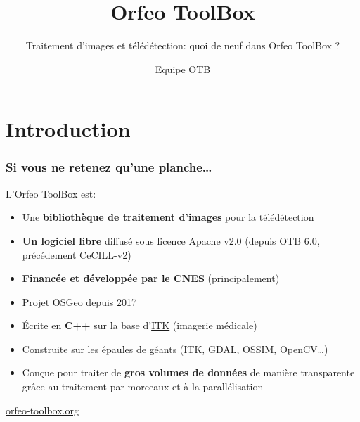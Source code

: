 \documentclass[8pt]{beamer}
\title{Orfeo ToolBox}
\subtitle{Traitement d'images et télédétection: quoi de neuf dans Orfeo ToolBox ?}
\author{Equipe OTB}%
\date{}
\begin{document}
\begin{frame}
\titlepage
\end{frame}

\section*{Introduction}

\begin{frame}
\frametitle{Si vous ne retenez qu'une planche\ldots}
\begin{block}{L'Orfeo ToolBox est:}
\begin{itemize}
\item Une \textbf{bibliothèque de traitement d'images} pour la télédétection
\item \textbf{Un logiciel libre} diffusé sous licence Apache v2.0 (depuis OTB 6.0, précédement CeCILL-v2)
\item \textbf{Financée et développée par le CNES} (principalement)
\item Projet OSGeo depuis 2017
\item Écrite en \textbf{C++} sur la base d'\href{www.itk.org}{ITK} (imagerie médicale)
\item Construite sur les épaules de géants (ITK, GDAL, OSSIM, OpenCV\ldots)
\item Conçue pour traiter de \textbf{gros volumes de données} de manière transparente grâce au traitement par morceaux et à la parallélisation
\end{itemize}
\end{block}

\begin{center}
{\huge\textcolor{red}{\href{http://www.orfeo-toolbox.org}{orfeo-toolbox.org}}}
\end{center}

\end{frame}
\end{document}
